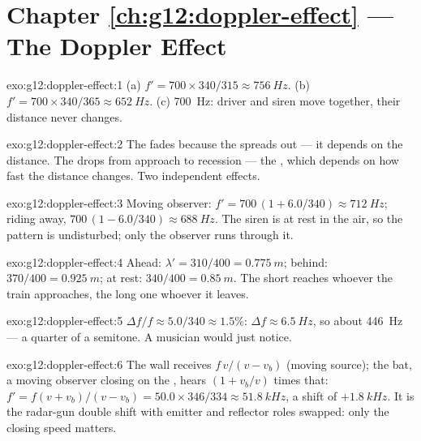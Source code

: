 \section*{Chapter \ref{ch:g12:doppler-effect} --- The Doppler Effect}

\begin{solution}{exo:g12:doppler-effect:1}
(a) $f' = 700 \times 340/315 \approx \qty{756}{Hz}$.
(b) $f' = 700 \times 340/365 \approx \qty{652}{Hz}$.
(c) \qty{700}{Hz}: driver and siren move together, their distance never changes.
\end{solution}

\begin{solution}{exo:g12:doppler-effect:2}
The \emph{} fades because the  spreads out --- it depends on the distance.
The \emph{} drops from approach to recession --- the , which depends
on how fast the distance changes. Two independent effects.
\end{solution}

\begin{solution}{exo:g12:doppler-effect:3}
Moving observer: $f' = 700\,(1 + 6.0/340) \approx \qty{712}{Hz}$; riding away,
$700\,(1 - 6.0/340) \approx \qty{688}{Hz}$. The siren is at rest in the air, so the 
pattern is undisturbed; only the observer runs through it.
\end{solution}

\begin{solution}{exo:g12:doppler-effect:4}
Ahead: $\lambda' = 310/400 = \qty{0.775}{m}$; behind: $370/400 = \qty{0.925}{m}$; at
rest: $340/400 = \qty{0.85}{m}$. The short  reaches whoever the train
approaches, the long one whoever it leaves.
\end{solution}

\begin{solution}{exo:g12:doppler-effect:5}
$\Delta f/f \approx 5.0/340 \approx 1.5\%$: $\Delta f \approx \qty{6.5}{Hz}$, so about
\qty{446}{Hz} --- a quarter of a semitone. A musician would just notice.
\end{solution}

\begin{solution}{exo:g12:doppler-effect:6}
The wall receives $f\,v/(v - v_b)$ (moving source); the bat, a moving observer closing on
the , hears $(1 + v_b/v)$ times that: $f' = f(v + v_b)/(v - v_b) = 50.0 \times
346/334 \approx \qty{51.8}{kHz}$, a shift of $+\qty{1.8}{kHz}$. It is the radar-gun
double shift with emitter and reflector roles swapped: only the closing speed matters.
\end{solution}

